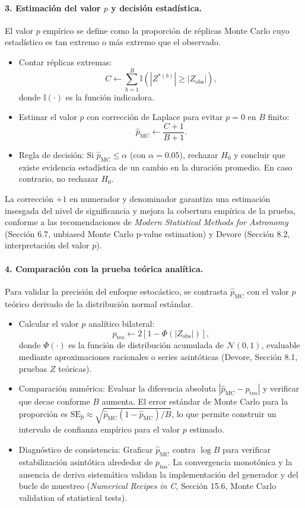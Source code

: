 \documentclass[12pt]{article}
\begin{document}
\paragraph{3. Estimación del valor $p$ y decisión estadística.}
El valor $p$ empírico se define como la proporción de réplicas Monte Carlo cuyo estadístico es tan extremo o más extremo que el observado.
\begin{itemize}
    \item Contar réplicas extremas: $$C \leftarrow \sum_{b=1}^B \mathbb{I}\left(|Z^{*(b)}| \geq |Z_{\text{obs}}|\right),$$ donde $\mathbb{I}(\cdot)$ es la función indicadora.
    \item Estimar el valor $p$ con corrección de Laplace para evitar $p=0$ en $B$ finito: $$\hat{p}_{\text{MC}} \leftarrow \frac{C + 1}{B + 1}.$$
    \item Regla de decisión: Si $\hat{p}_{\text{MC}} \leq \alpha$ (con $\alpha = 0.05$), rechazar $H_0$ y concluir que existe evidencia estadística de un cambio en la duración promedio. En caso contrario, no rechazar $H_0$.
\end{itemize}
La corrección $+1$ en numerador y denominador garantiza una estimación insesgada del nivel de significancia y mejora la cobertura empírica de la prueba, conforme a las recomendaciones de \textit{Modern Statistical Methods for Astronomy} (Sección 6.7, unbiased Monte Carlo p-value estimation) y Devore (Sección 8.2, interpretación del valor $p$).

\paragraph{4. Comparación con la prueba teórica analítica.}
Para validar la precisión del enfoque estocástico, se contrasta $\hat{p}_{\text{MC}}$ con el valor $p$ teórico derivado de la distribución normal estándar.
\begin{itemize}
    \item Calcular el valor $p$ analítico bilateral: $$p_{\text{teo}} \leftarrow 2 \left[1 - \Phi(|Z_{\text{obs}}|)\right],$$ donde $\Phi(\cdot)$ es la función de distribución acumulada de $\mathcal{N}(0,1)$, evaluable mediante aproximaciones racionales o series asintóticas (Devore, Sección 8.1, pruebas $Z$ teóricas).
    \item Comparación numérica: Evaluar la diferencia absoluta $|\hat{p}_{\text{MC}} - p_{\text{teo}}|$ y verificar que decae conforme $B$ aumenta. El error estándar de Monte Carlo para la proporción es $\text{SE}_{\hat{p}} \approx \sqrt{\hat{p}_{\text{MC}}(1-\hat{p}_{\text{MC}})/B}$, lo que permite construir un intervalo de confianza empírico para el valor $p$ estimado.
    \item Diagnóstico de consistencia: Graficar $\hat{p}_{\text{MC}}$ contra $\log B$ para verificar estabilización asintótica alrededor de $p_{\text{teo}}$. La convergencia monotónica y la ausencia de deriva sistemática validan la implementación del generador y del bucle de muestreo (\textit{Numerical Recipes in C}, Sección 15.6, Monte Carlo validation of statistical tests).
\end{itemize}
\end{document}
